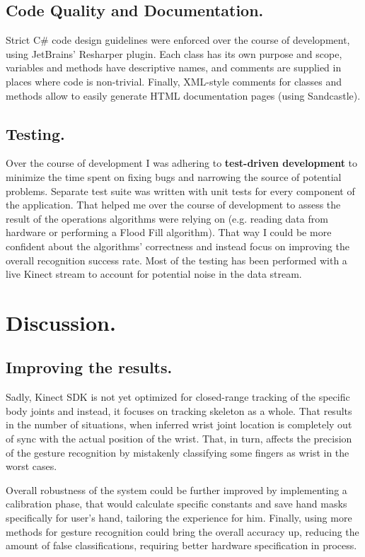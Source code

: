 \documentclass[a4paper,11pt,oneside]{article}
\begin{document}
\subsection{Code Quality and Documentation.}
Strict C\# code design guidelines were enforced over the course of development, using JetBrains' Resharper plugin. Each class has its own  purpose and scope, variables and methods have descriptive names, and comments are supplied in places where code is non-trivial. Finally, XML-style comments for classes and methods allow to easily generate HTML documentation pages (using Sandcastle).

\subsection{Testing.}
Over the course of development I was adhering to \textbf{test-driven development} to minimize the time spent on fixing bugs and narrowing the source of potential problems. Separate test suite was written with unit tests for every component of the application. That helped me over the course of development to assess the result of the operations algorithms were relying on (e.g. reading data from hardware or performing a Flood Fill algorithm). That way I could be more confident about the algorithms' correctness and instead focus on improving the overall recognition success rate. Most of the testing has been performed with a live Kinect stream to account for potential noise in the data stream.

\section{Discussion.}

\subsection{Improving the results.}
Sadly, Kinect SDK is not yet optimized for closed-range tracking of the specific body joints and instead, it focuses on tracking skeleton as a whole. That results in the number of situations, when inferred wrist joint location is completely out of sync with the actual position of the wrist. That, in turn, affects the precision of the gesture recognition by mistakenly classifying some fingers as wrist in the worst cases. 

Overall robustness of the system could be further improved by implementing a calibration phase, that would calculate specific constants and save hand masks specifically for user's hand, tailoring the experience for him. Finally, using more methods for gesture recognition could bring the overall accuracy up, reducing the amount of false classifications, requiring better hardware specification in process.
\end{document}
